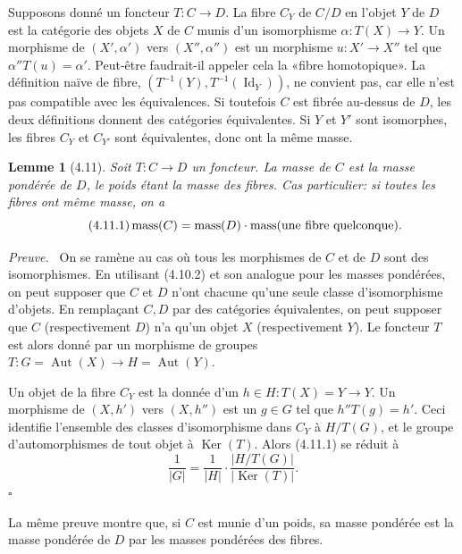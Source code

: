 \documentclass[10pt]{article}
\newcommand{\Aut}{\operatorname{Aut}}
\newcommand{\mass}{\operatorname{mass}}
\newcommand{\Id}{\operatorname{Id}}
\theoremstyle{deligne}
\newtheorem*{lemma*}{Lemme}
\newenvironment{proofdel}[1][Preuve.]{\textit{#1}\ }{\hfill$\square$}
\newcommand{\Ker}{\operatorname{Ker}}
\begin{document}
Supposons donné un foncteur $T:C\to D$. La fibre $C_Y$ de $C/D$ en l'objet $Y$ de $D$ est la catégorie des objets $X$ de $C$ munis d'un isomorphisme $\alpha:T(X)\to Y$. Un morphisme de $(X',\alpha')$ vers $(X'',\alpha'')$ est un morphisme $u:X'\to X''$ tel que $\alpha''T(u)=\alpha'$. Peut-être faudrait-il appeler cela la «fibre homotopique». La définition naïve de fibre, $(T^{-1}(Y),T^{-1}(\Id_Y))$, ne convient pas, car elle n'est pas compatible avec les équivalences. Si toutefois $C$ est fibrée au-dessus de $D$, les deux définitions donnent des catégories équivalentes. Si $Y$ et $Y'$ sont isomorphes, les fibres $C_Y$ et $C_{Y'}$ sont équivalentes, donc ont la même masse.

\begin{lemma*}[4.11]
Soit $T:C\to D$ un foncteur. La masse de $C$ est la masse pondérée de $D$, le poids étant la masse des fibres. Cas particulier: si toutes les fibres ont même masse, on a
\begin{equation}\tag{4.11.1}
\mass(C)=\mass(D)\cdot \mass(\hbox{une fibre quelconque}).
\end{equation}
\end{lemma*}

\begin{proofdel}[Preuve.]
On se ramène au cas où tous les morphismes de $C$ et de $D$ sont des isomorphismes. En utilisant (4.10.2) et son analogue pour les masses pondérées, on peut supposer que $C$ et $D$ n'ont chacune qu'une seule classe d'isomorphisme d'objets. En remplaçant $C,D$ par des catégories équivalentes, on peut supposer que $C$ (respectivement $D$) n'a qu'un objet $X$ (respectivement $Y$). Le foncteur $T$ est alors donné par un morphisme de groupes $T:G=\Aut(X)\to H=\Aut(Y)$.

Un objet de la fibre $C_Y$ est la donnée d'un $h\in H:T(X)=Y\to Y$. Un morphisme de $(X,h')$ vers $(X,h'')$ est un $g\in G$ tel que $h''T(g)=h'$. Ceci identifie l'ensemble des classes d'isomorphisme dans $C_Y$ à $H/T(G)$, et le groupe d'automorphismes de tout objet à $\Ker(T)$. Alors (4.11.1) se réduit à
\[
\frac1{|G|}=\frac1{|H|}\cdot \frac{|H/T(G)|}{|\Ker(T)|}.
\]
\end{proofdel}

La même preuve montre que, si $C$ est munie d'un poids, sa masse pondérée est la masse pondérée de $D$ par les masses pondérées des fibres.
\end{document}
